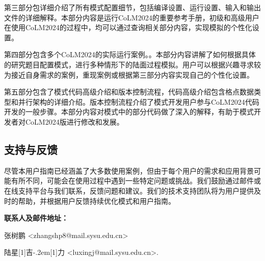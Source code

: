 第三部分包详细介绍了所有模式配置细节，包括编译设置、运行设置、输入和输出文件的详细解释。本部分内容是运行CoLM2024的重要参考手册，初级和高级用户在使用CoLM2024的过程中，均可以通过查询相关部分内容，实现模拟的个性化设置。

第四部分包含多个CoLM2024的实际运行案例。。本部分内容讲解了如何根据具体的研究题目配置模式，进行多种情形下的陆面过程模拟。用户可以根据兴趣寻求较为接近自身需求的案例，重现案例或根据第三部分内容实现自己的个性化设置。

第五部分包含了模式代码高级介绍和版本控制流程，代码高级介绍包含格点数据类型和并行架构的详细介绍。版本控制流程介绍了模式开发用户参与CoLM2024代码开发的一般步骤。本部分内容对模式中的部分代码做了深入的解释，有助于模式开发者对CoLM2024版进行修改和发展。

\subsection{支持与反馈}

尽管本用户指南已经涵盖了大多数使用案例，但由于每个用户的需求和应用背景可能有所不同，可能会在使用过程中遇到一些特定问题或挑战。我们鼓励通过邮件或在线支持平台与我们联系，反馈问题和建议。我们的技术支持团队将为用户提供及时的帮助，并根据用户反馈持续优化模式和用户指南。

\textbf{联系人及邮件地址：}

张树鹏 <zhangshp8@mail.sysu.edu.cn>

陆星\hbox{\scalebox{0.6}[1]{吉}\kern-.2em\scalebox{0.6}[1]{力}} <luxingj@mail.sysu.edu.cn>.


\clearpage
